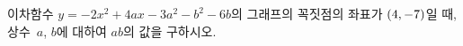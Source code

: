 이차함수 $y=-2x^2+4ax-3a^2-b^2-6b$의 그래프의 꼭짓점의 좌표가 $(4{,}\mkern3mu\mathopen{}-7)$일 때, 상수~$a$, $b$에 대하여 $ab$의 값을 구하시오.
